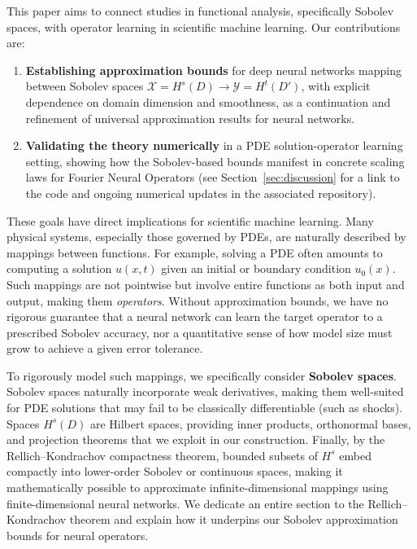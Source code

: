 \documentclass[11pt]{article}
\theoremstyle{plain}
\theoremstyle{definition}
\theoremstyle{remark}
\begin{document}
This paper aims to connect studies in functional analysis, specifically Sobolev spaces, with operator learning in scientific machine learning. Our contributions are:

\begin{enumerate}
    \item \textbf{Establishing approximation bounds} for deep neural networks
    mapping between Sobolev spaces $\mathcal{X} = H^s(D) \to \mathcal{Y} =
    H^t(D')$, with explicit dependence on domain dimension and smoothness, as
    a continuation and refinement of universal approximation results for
    neural networks.
    \item \textbf{Validating the theory numerically} in a PDE
    solution-operator learning setting, showing how the Sobolev-based bounds
    manifest in concrete scaling laws for Fourier Neural Operators (see
    Section~\ref{sec:discussion} for a link to the code and ongoing numerical
    updates in the associated repository).
\end{enumerate}

These goals have direct implications for scientific machine learning. Many physical systems, especially those governed by PDEs, are naturally described
by mappings between functions. For example, solving a PDE often amounts to computing a solution $u(x,t)$ given an initial or boundary condition $u_0(x)$. Such mappings are not pointwise but involve entire functions as
both input and output, making them \emph{operators}. Without approximation bounds, we have no rigorous guarantee that a neural network can learn the target operator to a prescribed Sobolev accuracy, nor a quantitative sense of how model size must grow to achieve a given error tolerance.

To rigorously model such mappings, we specifically consider \textbf{Sobolev spaces}. Sobolev spaces naturally incorporate weak derivatives, making them
well-suited for PDE solutions that may fail to be classically differentiable (such as shocks). Spaces $H^s(D)$ are Hilbert spaces, providing inner products, orthonormal bases, and projection theorems that we exploit in our construction. Finally, by the Rellich--Kondrachov compactness theorem, bounded subsets of $H^s$ embed compactly into lower-order Sobolev or continuous spaces, making it mathematically possible to approximate
infinite-dimensional mappings using finite-dimensional neural networks. We dedicate an entire section to the Rellich--Kondrachov theorem and explain how it underpins our Sobolev approximation bounds for neural operators.
\end{document}
